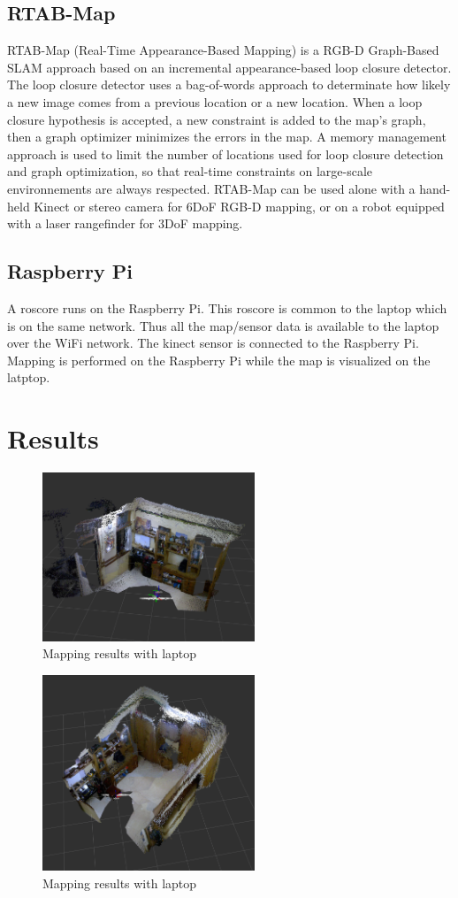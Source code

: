 \documentclass[journal]{IEEEtran}
\begin{document}
\subsection{RTAB-Map}
RTAB-Map (Real-Time Appearance-Based Mapping) is a RGB-D Graph-Based SLAM approach based on an incremental appearance-based loop closure detector. The loop closure detector uses a bag-of-words approach to determinate how likely a new image comes from a previous location or a new location. When a loop closure hypothesis is accepted, a new constraint is added to the map’s graph, then a graph optimizer minimizes the errors in the map. A memory management approach is used to limit the number of locations used for loop closure detection and graph optimization, so that real-time constraints on large-scale environnements are always respected. RTAB-Map can be used alone with a hand-held Kinect or stereo camera for 6DoF RGB-D mapping, or on a robot equipped with a laser rangefinder for 3DoF mapping.

\subsection{Raspberry Pi}
A roscore runs on the Raspberry Pi. This roscore is common to the laptop which is on the same network. Thus all the map/sensor data is available to the laptop over the WiFi network.
The kinect sensor is connected to the Raspberry Pi. Mapping is performed on the Raspberry Pi while the map is visualized on the latptop.

\section{Results}

\begin{figure}[ht]
\centering
\includegraphics[width=2.5in]{1(1).png}
\caption{Mapping results with laptop}
\label{fig_sim}
\end{figure}
 
\begin{figure}[ht]
	\centering
	\includegraphics[width=2.5in]{1(2).png}
	\caption{Mapping results with laptop}
	\label{fig_sim}
\end{figure}
\end{document}
